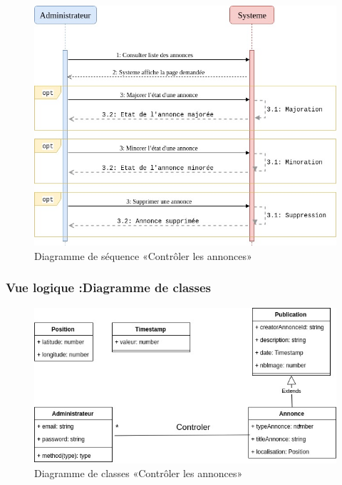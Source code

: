 \documentclass[11pt,a4paper,oneside]{book}
\begin{document}
					\begin{figure}[H]
						\centering
						\includegraphics[width=1\textwidth]{"Images/ch3/SequenceControlerAnnonce"}
						\caption{Diagramme de séquence «Contrôler les annonces»}
						\label{fig:controler-annonce}
					\end{figure}
					\subsubsection{Vue logique :Diagramme de classes}
					\begin{figure}[H]
						\centering
						\includegraphics[width=1\textwidth]{Images/ch3/classeControlerAnnonce}
						\caption{Diagramme de classes «Contrôler les annonces»
						}
						\label{fig:classecontrolerannonce}
					\end{figure}
					
\end{document}
